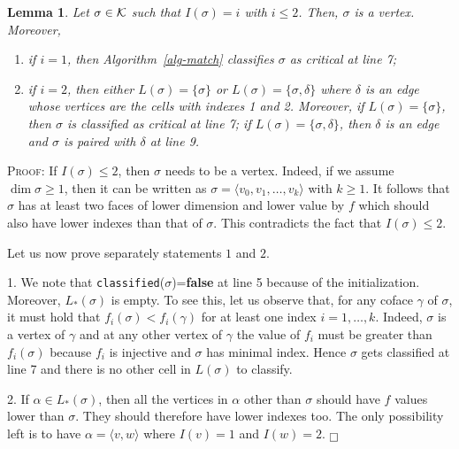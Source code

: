 \documentclass[12pt]{article}
\newtheorem{lem}[thm]{Lemma}
\newenvironment{proof}{\noindent\textsc{Proof: }}{\hfill$\fbox{}$\par\medskip\par}
\newcommand{\cK}{{\cal K}}
\begin{document}
\begin{lem}\label{lem:i=1-2}
Let $\sigma\in \cK$ such that  $I(\sigma)=i$ with $i\le 2$. Then, $\sigma$ is a vertex. Moreover,
\begin{enumerate}
\item if $i=1$, then Algorithm~\ref{alg-match} classifies $\sigma$ as critical at line 7;
\item if $i=2$, then either $L(\sigma) = \{ \sigma\}$ or $L(\sigma) = \{ \sigma, \delta\}$ where $\delta$ is an edge whose vertices are the cells with indexes 1 and 2. Moreover, if $L(\sigma) = \{ \sigma\}$, then $\sigma$ is classified as critical at line 7; if $L(\sigma) = \{ \sigma, \delta\}$, then $\delta$ is an edge and $\sigma$ is  paired with  $\delta$ at line 9.
\end{enumerate}
\end{lem}

\begin{proof}
If $I(\sigma)\le 2$, then $\sigma$ needs to be a vertex. Indeed, if we assume  $\dim \sigma \geq 1$, then it can be written as $\sigma = \langle v_0, v_1, \ldots, v_k \rangle$ with $k \geq 1$. It follows that $\sigma$ has at least two faces of lower dimension and lower value by $f$ which should also have lower indexes than that of $\sigma$.
This contradicts the fact that $I(\sigma) \le 2$.


Let us now prove separately statements $1$ and $2$.

1. We note that \texttt{classified}($\sigma$)={\bf false} at line 5 because of the initialization. Moreover, $L_*(\sigma)$ is empty. To see this, let us observe that, for any coface  $\gamma$ of $\sigma$,  it must hold that $f_i(\sigma)<f_i(\gamma)$ for at least one index $i=1,\ldots, k$. Indeed, $\sigma$ is a vertex of $\gamma$ and at any other vertex of $\gamma$   the value of $f_i$ must be greater than $f_i(\sigma)$ because $f_i$ is injective and $\sigma$ has minimal index. Hence $\sigma$ gets classified at line 7 and there is no other cell in $L(\sigma)$ to classify.

2.  If $\alpha \in L_*(\sigma)$, then all the vertices in $\alpha$ other than $\sigma$ should have  $f$ values lower than $\sigma$.
They should therefore have lower indexes too. The only possibility left is to have $\alpha = \langle v, w \rangle$ where $I(v) = 1$ and $I(w)=2$.
\end{proof}
\end{document}
